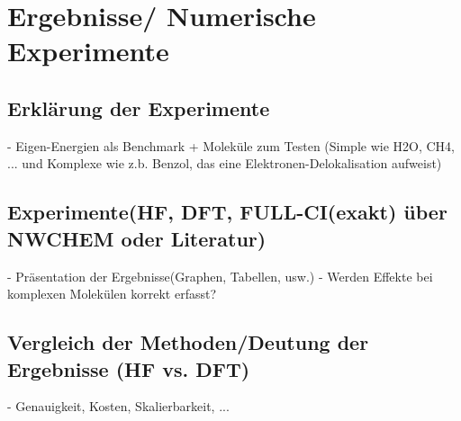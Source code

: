 \chapter{Ergebnisse/ Numerische Experimente}

\section{Erklärung der Experimente}
- Eigen-Energien als Benchmark + Moleküle zum Testen (Simple wie
H2O, CH4, ... und Komplexe wie z.b. Benzol, das eine
Elektronen-Delokalisation aufweist)

\section{Experimente(HF, DFT, FULL-CI(exakt) über NWCHEM oder Literatur)}
- Präsentation der Ergebnisse(Graphen, Tabellen, usw.)
- Werden Effekte bei komplexen Molekülen korrekt erfasst?

\section{Vergleich der Methoden/Deutung der Ergebnisse (HF vs. DFT)}
- Genauigkeit, Kosten, Skalierbarkeit, ...